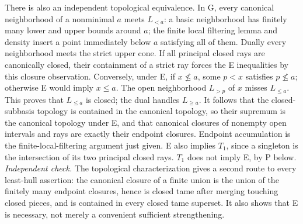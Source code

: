There is also an independent topological equivalence. In G, every canonical neighborhood of a nonminimal $a$ meets $L_{<a}$: a basic neighborhood has finitely many lower and upper bounds around $a$; the finite local filtering lemma and density insert a point immediately below $a$ satisfying all of them. Dually every neighborhood meets the strict upper cone. If all principal closed rays are canonically closed, their containment of a strict ray forces the E inequalities by this closure observation. Conversely, under E, if $x\not\leq a$, some $p<x$ satisfies $p\not\leq a$; otherwise E would imply $x\leq a$. The open neighborhood $L_{>p}$ of $x$ misses $L_{\leq a}$. This proves that $L_{\leq a}$ is closed; the dual handles $L_{\geq a}$. It follows that the closed-subbasis topology is contained in the canonical topology, so their supremum is the canonical topology under E, and that canonical closures of nonempty open intervals and rays are exactly their endpoint closures. Endpoint accumulation is the finite-local-filtering argument just given. E also implies $T_1$, since a singleton is the intersection of its two principal closed rays. $T_1$ does not imply E, by P below.
\emph{Independent check.} The topological characterization gives a second route to every least-hull assertion: the canonical closure of a finite union is the union of the finitely many endpoint closures, hence is closed tame after merging touching closed pieces, and is contained in every closed tame superset. It also shows that E is necessary, not merely a convenient sufficient strengthening.


